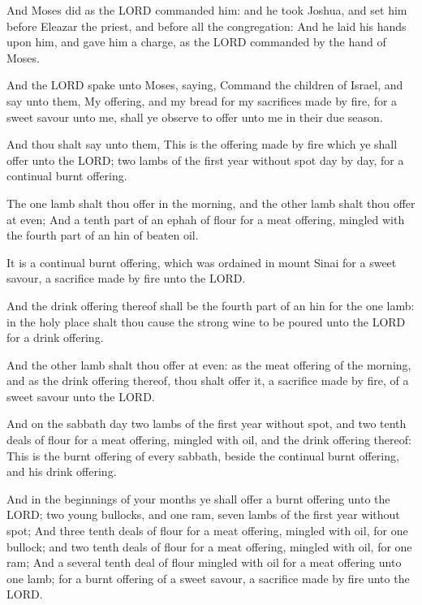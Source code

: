 \Verse And Moses did as the LORD commanded him: and he took Joshua, and
set him before Eleazar the priest, and before all the congregation:
\Verse And he laid his hands upon him, and gave him a charge, as the
LORD commanded by the hand of Moses.


\Chapter
\Verse And the LORD spake unto Moses, saying, \Verse Command the children
of Israel, and say unto them, My offering, and my bread for my
sacrifices made by fire, for a sweet savour unto me, shall ye observe
to offer unto me in their due season.

\Verse And thou shalt say unto them, This is the offering made by fire
which ye shall offer unto the LORD; two lambs of the first year
without spot day by day, for a continual burnt offering.

\Verse The one lamb shalt thou offer in the morning, and the other lamb
shalt thou offer at even; \Verse And a tenth part of an ephah of flour
for a meat offering, mingled with the fourth part of an hin of beaten
oil.

\Verse It is a continual burnt offering, which was ordained in mount
Sinai for a sweet savour, a sacrifice made by fire unto the LORD.

\Verse And the drink offering thereof shall be the fourth part of an hin
for the one lamb: in the holy place shalt thou cause the strong wine
to be poured unto the LORD for a drink offering.

\Verse And the other lamb shalt thou offer at even: as the meat offering
of the morning, and as the drink offering thereof, thou shalt offer
it, a sacrifice made by fire, of a sweet savour unto the LORD.

\Verse And on the sabbath day two lambs of the first year without spot,
and two tenth deals of flour for a meat offering, mingled with oil,
and the drink offering thereof: \Verse This is the burnt offering of
every sabbath, beside the continual burnt offering, and his drink
offering.

\Verse And in the beginnings of your months ye shall offer a burnt
offering unto the LORD; two young bullocks, and one ram, seven lambs
of the first year without spot; \Verse And three tenth deals of flour
for a meat offering, mingled with oil, for one bullock; and two tenth
deals of flour for a meat offering, mingled with oil, for one ram;
\Verse And a several tenth deal of flour mingled with oil for a meat
offering unto one lamb; for a burnt offering of a sweet savour, a
sacrifice made by fire unto the LORD.

